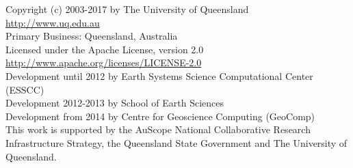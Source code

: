 
%
%
%

\begin{center}
Copyright (c) 2003-2017 by The University of Queensland\\
\url{http://www.uq.edu.au}\\
Primary Business: Queensland, Australia\\
Licensed under the Apache License, version 2.0\\
\url{http://www.apache.org/licenses/LICENSE-2.0}\\
Development until 2012 by Earth Systems Science Computational Center (ESSCC)\\
Development 2012-2013 by School of Earth Sciences\\
Development from 2014 by Centre for Geoscience Computing (GeoComp)\\

This work is supported by the AuScope National Collaborative Research
Infrastructure Strategy, the Queensland State Government and The University
of Queensland.
\end{center}

